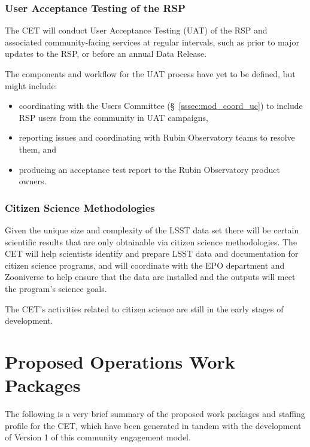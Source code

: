 \documentclass[DM,lsstdraft,toc]{lsstdoc}
\begin{document}
\subsubsection{User Acceptance Testing of the RSP}\label{sssec:mod_dev_uat}

The CET will conduct User Acceptance Testing (UAT) of the RSP and associated community-facing services at regular intervals, such as prior to major updates to the RSP, or before an annual Data Release.

The components and workflow for the UAT process have yet to be defined, but might include:
\begin{itemize}
\item coordinating with the Users Committee (\S~\ref{sssec:mod_coord_uc}) to include RSP users from the community in UAT campaigns,
\item reporting issues and coordinating with Rubin Observatory teams to resolve them, and
\item producing an acceptance test report to the Rubin Observatory product owners.
\end{itemize}


\subsubsection{Citizen Science Methodologies}\label{sssec:mod_dev_citizen}

Given the unique size and complexity of the LSST data set there will be certain scientific results that are only obtainable via citizen science methodologies.
The CET will help scientists identify and prepare LSST data and documentation for citizen science programs, and will coordinate with the EPO department and Zooniverse to help ensure that the data are installed and the outputs will meet the program's science goals.

The CET's activities related to citizen science are still in the early stages of development.






\section{Proposed Operations Work Packages}\label{sec:comp}

The following is a very brief summary of the proposed work packages and staffing profile for the CET, which have been generated in tandem with the development of Version 1 of this community engagement model.
\end{document}
